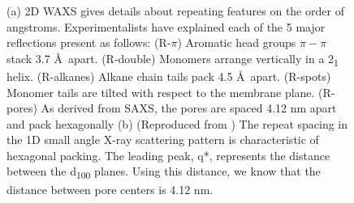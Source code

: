 \documentclass[journal=jpcbfk,manuscript=article]{achemso}
\begin{document}
\begin{figure}[!htb]
\begin{subfigure}[t]{0.405\linewidth}
                \caption{}\label{fig:SAXS}
        \end{subfigure}
	\caption{(a) 2D WAXS gives details about repeating features on the
		order of angstroms. Experimentalists have explained each of the 5 major
		reflections present as follows: (R-$\pi$) Aromatic head groups $\pi-\pi$ stack
		3.7 \AA~apart. (R-double) Monomers arrange vertically in a 2\textsubscript{1}
		helix. (R-alkanes) Alkane chain tails pack 4.5 \AA~apart. (R-spots) Monomer
		tails are tilted with respect to the membrane plane. (R-pores) As derived from
		SAXS, the pores are spaced 4.12 nm apart and pack hexagonally (b) (Reproduced
		from ) The repeat spacing in the 1D small angle X-ray
		scattering pattern is characteristic of hexagonal packing. The leading peak,
		q*, represents the distance between the d\textsubscript{100} planes. Using this
		distance, we know that the distance between pore centers is 4.12 nm.} 
	\label{fig:SWAXS}
 \end{figure}
  
\end{document}
